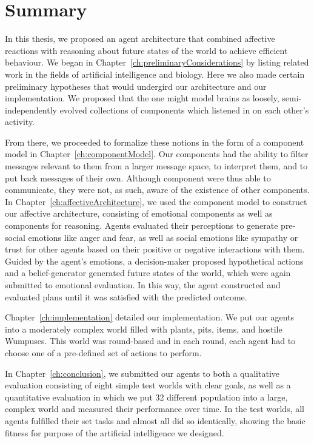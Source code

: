 \section{Summary}

In this thesis, we proposed an agent architecture that combined affective reactions with reasoning about future states of the world to achieve efficient behaviour. We began in Chapter~\ref{ch:preliminaryConsiderations} by listing related work in the fields of artificial intelligence and biology. Here we also made certain preliminary hypotheses that would undergird our architecture and our implementation. We proposed that the one might model brains as loosely, semi-independently evolved collections of components which listened in on each other's activity.

From there, we proceeded to formalize these notions in the form of a component model in Chapter~\ref{ch:componentModel}. Our components had the ability to filter messages relevant to them from a larger message space, to interpret them, and to put back messages of their own. Although component were thus able to communicate, they were not, as such, aware of the existence of other components. In Chapter~\ref{ch:affectiveArchitecture}, we used the component model to construct our affective architecture, consisting of emotional components as well as components for reasoning. Agents evaluated their perceptions to generate pre-social emotions like anger and fear, as well as social emotions like sympathy or trust for other agents based on their positive or negative interactions with them. Guided by the agent's emotions, a decision-maker proposed hypothetical actions and a belief-generator generated future states of the world, which were again submitted to emotional evaluation. In this way, the agent constructed and evaluated plans until it was satisfied with the predicted outcome.

Chapter~\ref{ch:implementation} detailed our implementation. We put our agents into a moderately complex world filled with plants, pits, items, and hostile Wumpuses. This world was round-based and in each round, each agent had to choose one of a pre-defined set of actions to perform.

In Chapter~\ref{ch:conclusion}, we submitted our agents to both a qualitative evaluation consisting of eight simple test worlds with clear goals, as well as a quantitative evaluation in which we put 32 different population into a large, complex world and measured their performance over time. In the test worlds, all agents fulfilled their set tasks and almost all did so identically, showing the basic fitness for purpose of the artificial intelligence we designed.

